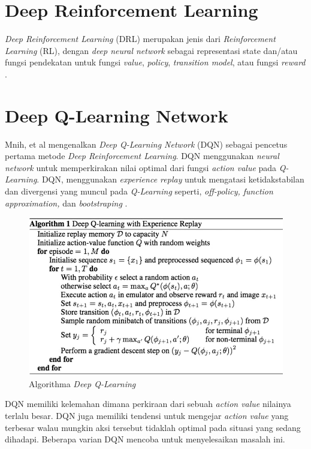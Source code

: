 \section{Deep Reinforcement Learning}
\emph{Deep Reinforcement Learning} (DRL) merupakan jenis dari \emph{Reinforcement Learning} (RL), dengan \emph{deep neural network} sebagai representasi state
dan/atau fungsi pendekatan untuk fungsi \emph{value}, \emph{policy}, \emph{transition model}, atau fungsi \emph{reward} \citep{deepRL}.

\section{Deep Q-Learning Network}
Mnih, et al mengenalkan \emph{Deep Q-Learning Network} (DQN)\citep{deepQN} sebagai pencetus pertama metode \emph{Deep Reinforcement Learning}. DQN menggunakan \emph{neural network} untuk memperkirakan nilai optimal dari fungsi \emph{action value} pada \emph{Q-Learning}.
DQN, menggunakan \emph{experience replay} untuk mengatasi ketidakstabilan dan divergensi yang muncul pada \emph{Q-Learning} seperti, \emph{off-policy, function approximation,} dan \emph{bootstraping} \citep{deepQNFunction}.

\begin{figure}[H]
  \centering
    \includegraphics[scale=0.35]{gambar/dqn_algorithm.png}
    \caption{Algorithma \emph{Deep Q-Learning}}
    \label{fig:dqnAlgorithm}
\end{figure}

DQN memiliki kelemahan dimana perkiraan dari sebuah \emph{action value} nilainya terlalu besar.
DQN juga memiliki tendensi untuk mengejar \emph{action value} yang terbesar walau mungkin aksi tersebut tidaklah optimal pada situasi yang sedang dihadapi.
Beberapa varian DQN mencoba untuk menyelesaikan masalah ini. 

